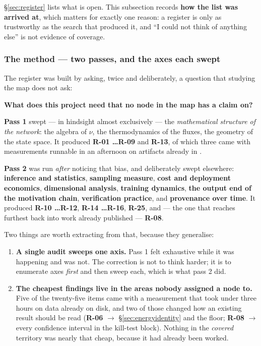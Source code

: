 \S\ref{sec:register} lists what is open. This subsection records \textbf{how the
list was arrived at}, which matters for exactly one reason: a register is only
as trustworthy as the search that produced it, and ``I could not think of
anything else'' is not evidence of coverage.

\subsubsection{The method --- two passes, and the axes each swept}
\label{sec:twopasses}

The register was built by asking, twice and deliberately, a question that
studying the map does not ask:

\begin{invariant}
\textbf{What does this project need that no node in the map has a claim on?}
\end{invariant}

\textbf{Pass 1} swept --- in hindsight almost exclusively --- the
\emph{mathematical structure of the network}: the algebra of $\nu$, the
thermodynamics of the fluxes, the geometry of the state space. It produced
\textbf{R-01 \ldots R-09} and \textbf{R-13}, of which three came with
measurements runnable in an afternoon on artifacts already in .

\textbf{Pass 2} was run \emph{after} noticing that bias, and deliberately swept
elsewhere: \textbf{inference and statistics}, \textbf{sampling measure},
\textbf{cost and deployment economics}, \textbf{dimensional analysis},
\textbf{training dynamics}, \textbf{the output end of the motivation chain},
\textbf{verification practice}, and \textbf{provenance over time}. It produced
\textbf{R-10 \ldots R-12}, \textbf{R-14 \ldots R-16}, \textbf{R-25}, and --- the
one that reaches furthest back into work already published --- \textbf{R-08}.

Two things are worth extracting from that, because they generalise:

\begin{enumerate}
\item \textbf{A single audit sweeps one axis.} Pass 1 felt exhaustive while it
  was happening and was not. The correction is not to think harder; it is to
  enumerate axes \emph{first} and then sweep each, which is what pass 2 did.
\item \textbf{The cheapest findings live in the areas nobody assigned a node
  to.} Five of the twenty-five items came with a measurement that took under
  three hours on data already on disk, and two of those changed how an existing
  result should be read (\textbf{R-06} $\to$ \S\ref{sec:energyidentity} and the
  \kap{} floor; \textbf{R-08} $\to$ every confidence interval in the kill-test
  block). Nothing in the \emph{covered} territory was nearly that cheap, because
  it had already been worked.
\end{enumerate}

